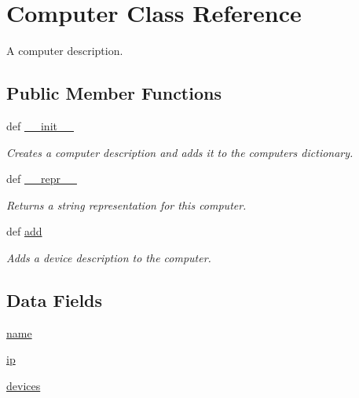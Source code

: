 \hypertarget{classsettings__classes_1_1_computer}{\section{\-Computer \-Class \-Reference}
\label{classsettings__classes_1_1_computer}
}


\-A computer description.  


\subsection*{\-Public \-Member \-Functions}
\begin{DoxyCompactItemize}
\item 
def \hyperlink{classsettings__classes_1_1_computer_ac775ee34451fdfa742b318538164070e}{\-\_\-\-\_\-init\-\_\-\-\_\-}
\begin{DoxyCompactList}\small\item\em \-Creates a computer description and adds it to the computers dictionary. \end{DoxyCompactList}\item 
def \hyperlink{classsettings__classes_1_1_computer_ad8b9328939df072e4740cd9a63189744}{\-\_\-\-\_\-repr\-\_\-\-\_\-}
\begin{DoxyCompactList}\small\item\em \-Returns a string representation for this computer. \end{DoxyCompactList}\item 
def \hyperlink{classsettings__classes_1_1_computer_a66aa7c8063db6217a0a0061f8b7ba206}{add}
\begin{DoxyCompactList}\small\item\em \-Adds a device description to the computer. \end{DoxyCompactList}\end{DoxyCompactItemize}
\subsection*{\-Data \-Fields}
\begin{DoxyCompactItemize}
\item 
\hyperlink{classsettings__classes_1_1_computer_ab74e6bf80237ddc4109968cedc58c151}{name}
\item 
\hyperlink{classsettings__classes_1_1_computer_afd65cf072a93c93ad52b9f25b341e10b}{ip}
\item 
\hyperlink{classsettings__classes_1_1_computer_aa4b88f24716e66e8d41400b00e8ae8ae}{devices}
\end{DoxyCompactItemize}


